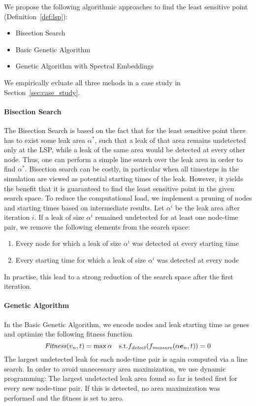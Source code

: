 We propose the following algorithmic approaches to find the least
sensitive point (Definition~\ref{def:lsp}):
\begin{itemize}
\item Bisection Search
\item Basic Genetic Algorithm
\item Genetic Algorithm with Spectral Embeddings
\end{itemize}
We empirically evluate all three mehods in a case study in Section~\ref{sec:case_study}.

\paragraph*{Bisection Search}
The Bisection Search is based on the fact that for the least sensitive point
there has to exist some leak area $\alpha^*$, such that a leak of that area
remains undetected only at the LSP, while a leak of the same area would be
detected at every other node. Thus, one can perform a simple line search over
the leak area in order to find $\alpha^*$. Bisection search can be costly, in
particular when all timesteps in the simulation are viewed as potential
starting times of the leak. However, it yields the benefit that it is
guaranteed to find the least sensitive point in the given search space. To
reduce the computational load, we implement a pruning of nodes and starting
times based on intermediate results. Let $\alpha^i$ be the leak area after
iteration $i$. If a leak of size $\alpha^i$ remained undetected for at least
one node-time pair, we remove the following elements from the search space:
\begin{enumerate}
\item Every node for which a leak of size $\alpha^i$ was detected at every
starting time
\item Every starting time for which a leak of size $\alpha^i$ was detected at
every node
\end{enumerate}
In practise, this lead to a strong reduction of the search space after the
first iteration.

\paragraph*{Genetic Algorithm}
In the Basic Genetic Algorithm, we encode nodes and leak starting time as genes
and optimize the following fitness function
\begin{equation}
\mathit{Fitness} (v_n,t) = \max \alpha \quad \text{s.t.} f_{\mathit{detect}}(f_{\mathit{measure}}(\alpha
\bm{e}_n, t)) = 0
\end{equation}
The largest undetected leak for each node-time pair is again computed via
a line search. In order to avoid unnecessary area maximization, we use
dynamic programming: The largest undetected leak area found so far is tested
first for every new node-time pair. If this is detected, no area maximization
was performed and the fitness is set to zero.

